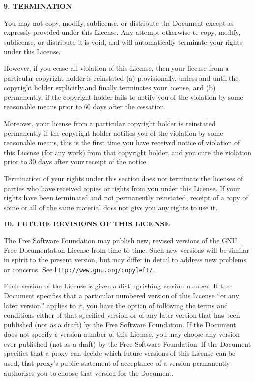 \documentclass[a4paper]{report}
\begin{document}
\begin{center}
{\Large\bf 9. TERMINATION\par}
{}
\end{center}


You may not copy, modify, sublicense, or distribute the Document
except as expressly provided under this License.  Any attempt
otherwise to copy, modify, sublicense, or distribute it is void, and
will automatically terminate your rights under this License.

However, if you cease all violation of this License, then your license
from a particular copyright holder is reinstated (a) provisionally,
unless and until the copyright holder explicitly and finally
terminates your license, and (b) permanently, if the copyright holder
fails to notify you of the violation by some reasonable means prior to
60 days after the cessation.

Moreover, your license from a particular copyright holder is
reinstated permanently if the copyright holder notifies you of the
violation by some reasonable means, this is the first time you have
received notice of violation of this License (for any work) from that
copyright holder, and you cure the violation prior to 30 days after
your receipt of the notice.

Termination of your rights under this section does not terminate the
licenses of parties who have received copies or rights from you under
this License.  If your rights have been terminated and not permanently
reinstated, receipt of a copy of some or all of the same material does
not give you any rights to use it.


\begin{center}
{\Large\bf 10. FUTURE REVISIONS OF THIS LICENSE\par}
{}
\end{center}


The Free Software Foundation may publish new, revised versions
of the GNU Free Documentation License from time to time.  Such new
versions will be similar in spirit to the present version, but may
differ in detail to address new problems or concerns.  See
\texttt{http://www.gnu.org/copyleft/}.

Each version of the License is given a distinguishing version number.
If the Document specifies that a particular numbered version of this
License ``or any later version'' applies to it, you have the option of
following the terms and conditions either of that specified version or
of any later version that has been published (not as a draft) by the
Free Software Foundation.  If the Document does not specify a version
number of this License, you may choose any version ever published (not
as a draft) by the Free Software Foundation.  If the Document
specifies that a proxy can decide which future versions of this
License can be used, that proxy's public statement of acceptance of a
version permanently authorizes you to choose that version for the
Document.
\end{document}
